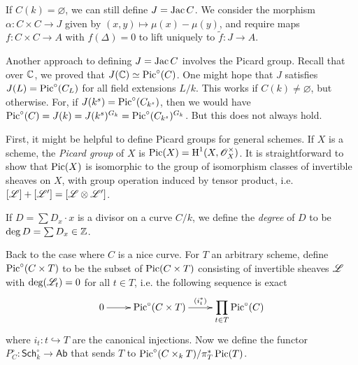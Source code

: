 \documentclass{article}
\begin{document}
If $C(k)=\varnothing$, we can still define $J=\operatorname{Jac} C$. We consider the 
morphism $\alpha:C\times C\to J$ given by $(x,y)\mapsto \mu(x)-\mu(y)$, 
and require maps $f:C\times C\to A$ with $f(\Delta)=0$ to lift uniquely 
to $\tilde f:J\to A$. 

Another approach to defining $J=\operatorname{Jac} C$ involves the Picard group. Recall 
that over $\mathbb{C}$, we proved that $J(\mathbb{C})\simeq\operatorname{Pic}^\circ(C)$. 
One might hope that $J$ satisfies $J(L)=\operatorname{Pic}^\circ(C_L)$ for all field 
extensions $L/k$. This works if $C(k)\ne\varnothing$, but otherwise. For, 
if $J(k^s)=\operatorname{Pic}^\circ(C_{k^s})$, then we would have 
$\operatorname{Pic}^\circ(C) = J(k) = J(k^s)^{G_k} = \operatorname{Pic}^\circ(C_{k^s})^{G_k}$. But this 
does not always hold. 

First, it might be helpful to define Picard groups for general schemes. If 
$X$ is a scheme, the \emph{Picard group} of $X$ is 
$\operatorname{Pic}(X)=\operatorname{H}^1(X,\mathscr{O}_X^\times)$. It is straightforward to show that 
$\operatorname{Pic}(X)$ is isomorphic to the group of isomorphism classes of invertible 
sheaves on $X$, with group operation induced by tensor product, i.e. 
$[\mathscr{L}] + [\mathscr{L'}] = [\mathscr{L}\otimes \mathscr{L}']$. 

If $D = \sum D_x\cdot x$ is a divisor on a curve $C/k$, we define the 
\emph{degree} of $D$ to be $\deg D=\sum D_x \in \mathbb{Z}$. 

Back to the case where $C$ is a nice curve. For $T$ an arbitrary scheme, define 
$\operatorname{Pic}^\circ(C\times T)$ to be the subset of $\operatorname{Pic}(C\times T)$ consisting of 
invertible sheaves $\mathscr{L}$ with $\deg(\mathscr{L}_t)=0$ for all $t\in T$, 
i.e. the following sequence is exact 
\[\xymatrix{
  0 \ar[r] 
    & \pic^\circ(C\times T) \ar[r]^-{(i_t^*)}
    & \displaystyle\prod_{t\in T} \pic^\circ (C) 
}\]
where $i_t:t\hookrightarrow T$ are the canonical injections. Now we define the 
functor $P_C^\circ:\mathsf{Sch}_k^\circ\to\mathsf{Ab}$ that sends $T$ to 
$\operatorname{Pic}^\circ(C\times_k T)/\pi_T^*\operatorname{Pic}(T)$. 
\end{document}
